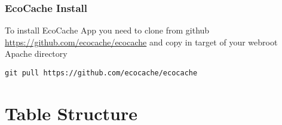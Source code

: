\documentclass[letterpaper,10pt,english]{sphinxmanual}
\begin{document}
\subsection{EcoCache Install}
\label{prerequisites:ecocache-install}
To install EcoCache App you need to clone from github \href{https://github.com/ecocache/ecocache}{https://github.com/ecocache/ecocache} and copy in target
of your webroot Apache directory

\begin{Verbatim}[commandchars=\\\{\}]
git pull https://github.com/ecocache/ecocache
\end{Verbatim}


\chapter{Table Structure}
\end{document}
